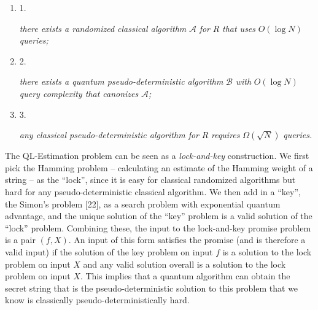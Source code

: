 \documentclass[10pt,a4paper]{article}
\begin{document}
\begin{enumerate}


\item[] 
1. 


\emph{there exists a randomized classical algorithm }$\mathcal{A}$\emph{ for }${R}$\emph{ that uses }$O(\log N)$\emph{ queries;}\par





\item[] 
2. 


\emph{there exists a quantum pseudo-deterministic algorithm }$\mathcal{B}$\emph{ with }$O(\log N)$\emph{ query complexity that canonizes }$\mathcal{A}$\emph{;}\par





\item[] 
3. 


\emph{any classical pseudo-deterministic algorithm for }${R}$\emph{ requires }$\Omega(\sqrt{N})$\emph{ queries.}\par





\end{enumerate}







The QL-Estimation problem can be seen as
a \emph{lock-and-key} construction. We first pick the Hamming problem – calculating an estimate of the Hamming weight of a string – as the “lock”, since it is easy for classical randomized algorithms but hard for any pseudo-deterministic classical algorithm. We then add in a “key”, the Simon’s problem [22], as a search problem with exponential quantum advantage, and the unique solution of the “key” problem is a valid solution of the “lock” problem.
Combining these, the input to the lock-and-key promise problem is a pair $(f,X)$. An input of this form satisfies the promise (and is therefore a valid input) if the solution of the key problem on input $f$ is a solution to the lock problem on input $X$ and any valid solution overall is a solution to the lock problem on input $X$. This implies that a quantum algorithm can obtain the secret string that is the pseudo-deterministic solution to this problem that we know is classically pseudo-deterministically hard.\par
\end{document}
